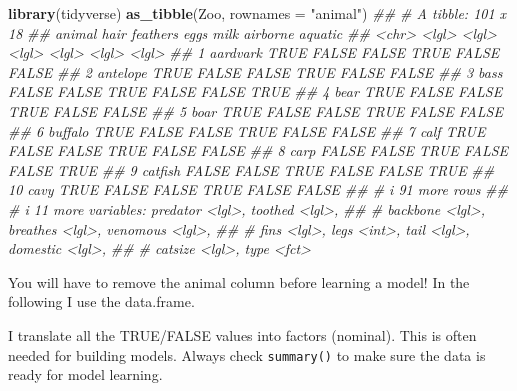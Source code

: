 \documentclass[
  notitlepage]{book}
\newenvironment{Shaded}{\begin{snugshade}}{\end{snugshade}}
\newcommand{\CommentTok}[1]{\textcolor[rgb]{0.56,0.35,0.01}{\textit{#1}}}
\newcommand{\DataTypeTok}[1]{\textcolor[rgb]{0.13,0.29,0.53}{#1}}
\newcommand{\KeywordTok}[1]{\textcolor[rgb]{0.13,0.29,0.53}{\textbf{#1}}}
\newcommand{\NormalTok}[1]{#1}
\newcommand{\StringTok}[1]{\textcolor[rgb]{0.31,0.60,0.02}{#1}}
\begin{document}
\begin{Shaded}
\begin{Highlighting}[]
\KeywordTok{library}\NormalTok{(tidyverse)}
\KeywordTok{as\_tibble}\NormalTok{(Zoo, }\DataTypeTok{rownames =} \StringTok{"animal"}\NormalTok{)}
\CommentTok{\#\# \# A tibble: 101 x 18}
\CommentTok{\#\#    animal   hair  feathers eggs  milk  airborne aquatic}
\CommentTok{\#\#    \textless{}chr\textgreater{}    \textless{}lgl\textgreater{} \textless{}lgl\textgreater{}    \textless{}lgl\textgreater{} \textless{}lgl\textgreater{} \textless{}lgl\textgreater{}    \textless{}lgl\textgreater{}  }
\CommentTok{\#\#  1 aardvark TRUE  FALSE    FALSE TRUE  FALSE    FALSE  }
\CommentTok{\#\#  2 antelope TRUE  FALSE    FALSE TRUE  FALSE    FALSE  }
\CommentTok{\#\#  3 bass     FALSE FALSE    TRUE  FALSE FALSE    TRUE   }
\CommentTok{\#\#  4 bear     TRUE  FALSE    FALSE TRUE  FALSE    FALSE  }
\CommentTok{\#\#  5 boar     TRUE  FALSE    FALSE TRUE  FALSE    FALSE  }
\CommentTok{\#\#  6 buffalo  TRUE  FALSE    FALSE TRUE  FALSE    FALSE  }
\CommentTok{\#\#  7 calf     TRUE  FALSE    FALSE TRUE  FALSE    FALSE  }
\CommentTok{\#\#  8 carp     FALSE FALSE    TRUE  FALSE FALSE    TRUE   }
\CommentTok{\#\#  9 catfish  FALSE FALSE    TRUE  FALSE FALSE    TRUE   }
\CommentTok{\#\# 10 cavy     TRUE  FALSE    FALSE TRUE  FALSE    FALSE  }
\CommentTok{\#\# \# i 91 more rows}
\CommentTok{\#\# \# i 11 more variables: predator \textless{}lgl\textgreater{}, toothed \textless{}lgl\textgreater{},}
\CommentTok{\#\# \#   backbone \textless{}lgl\textgreater{}, breathes \textless{}lgl\textgreater{}, venomous \textless{}lgl\textgreater{},}
\CommentTok{\#\# \#   fins \textless{}lgl\textgreater{}, legs \textless{}int\textgreater{}, tail \textless{}lgl\textgreater{}, domestic \textless{}lgl\textgreater{},}
\CommentTok{\#\# \#   catsize \textless{}lgl\textgreater{}, type \textless{}fct\textgreater{}}
\end{Highlighting}
\end{Shaded}

You will have to remove the animal column before learning a model! In
the following I use the data.frame.

I translate all the TRUE/FALSE values into factors (nominal). This is
often needed for building models. Always check \texttt{summary()} to make sure
the data is ready for model learning.
\end{document}
